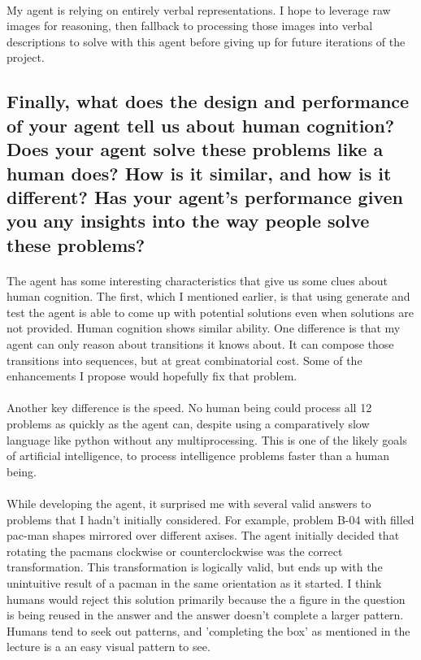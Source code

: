 \documentclass[12pt]{article}
\begin{document}
\paragraph{}
My agent is relying on entirely verbal representations. I hope to leverage raw images for reasoning, then fallback to processing those images into verbal descriptions to solve with this agent before giving up for future iterations of the project. 
\subsection{Finally, what does the design and performance of your agent tell us about human cognition? Does your agent solve these problems like a human does? How is it similar, and how is it different? Has your agent’s performance given you any insights into the way people solve these problems?}
\paragraph{}
The agent has some interesting characteristics that give us some clues about human cognition. The first, which I mentioned earlier, is that using generate and test the agent is able to come up with potential solutions even when solutions are not provided. Human cognition shows similar ability. One difference is that my agent can only reason about transitions it knows about. It can compose those transitions into sequences, but at great combinatorial cost. Some of the enhancements I propose would hopefully fix that problem.
\paragraph{}
Another key difference is the speed. No human being could process all 12 problems as quickly as the agent can, despite using a comparatively slow language like python without any multiprocessing. This is one of the likely goals of artificial intelligence, to process intelligence problems faster than a human being.
\paragraph{}
While developing the agent, it surprised me with several valid answers to problems that I hadn't initially considered. For example, problem B-04 with filled pac-man shapes mirrored over different axises. The agent initially decided that rotating the pacmans clockwise or counterclockwise was the correct transformation. This transformation is logically valid, but ends up with the unintuitive result of a pacman in the same orientation as it started. I think humans would reject this solution primarily because the a figure in the question is being reused in the answer and the answer doesn't complete a larger pattern. Humans tend to seek out patterns, and 'completing the box' as mentioned in the lecture is a an easy visual pattern to see. 
\end{document}
